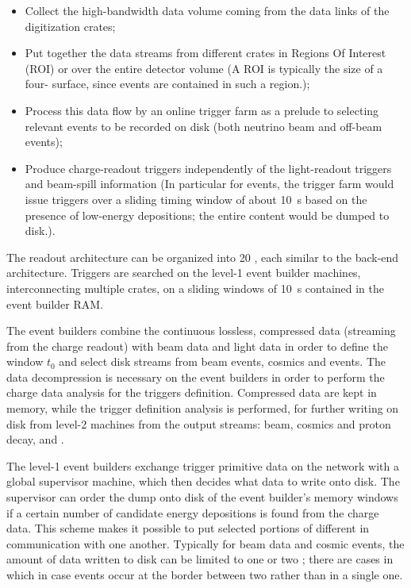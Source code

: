 \begin{itemize}
\item Collect the high-bandwidth data volume coming from the data links of the  digitization crates; 
\item Put together the data streams from different crates in Regions Of Interest (ROI) or over the entire detector volume (A ROI is typically the size of a  four- surface, since events are contained in such a region.);
\item Process this data flow by an online trigger farm  as a prelude to selecting relevant events to be recorded on disk (both neutrino beam and off-beam events);
\item Produce charge-readout triggers independently of the light-readout triggers and beam-spill information 
(In particular for  events, the trigger farm would issue triggers over a sliding timing window of about \SI{10}{s}  based on the presence of low-energy depositions; the entire content would be dumped to disk.).
\end{itemize}

The \dual readout architecture can be organized into \num{20} , each similar to the  back-end architecture. Triggers are searched on the level-1 event builder machines, interconnecting multiple  crates, on a sliding windows of \SI{10}{s}  contained in the event builder RAM.

The event builders combine the continuous lossless, compressed data (streaming from the charge readout) with beam data and light data in order to define the window $t_0$ and select disk streams from beam events, cosmics and  events. The data decompression is necessary on the event builders in order to perform the charge data analysis for the triggers definition. Compressed data are kept in memory, while the trigger definition analysis is performed, for further writing on disk from level-2 machines from the output streams: beam, cosmics and proton decay, and . 

The level-1 event builders exchange trigger primitive data on the network with a global supervisor machine, which then decides what data to write onto disk.  The supervisor can order the dump onto disk of the event builder's memory  windows if a certain number of candidate energy depositions is found from the charge data.  This scheme makes it possible to put selected portions of different  in communication with one another.  
Typically for beam data and cosmic events, the amount of data written to disk can be limited to one or two ; there are cases in which in case events occur at the border between two  rather than in a single one.


